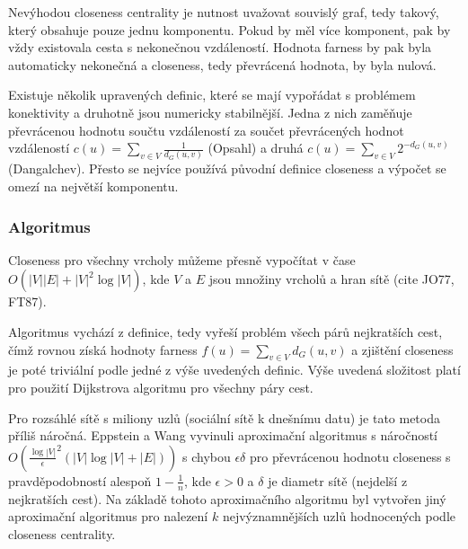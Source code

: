 \documentclass[12pt,titlepage]{report}
\begin{document}
Nevýhodou closeness centrality je nutnost uvažovat souvislý graf, tedy takový,
který obsahuje pouze jednu komponentu. Pokud by měl více komponent, pak by vždy
existovala cesta s nekonečnou vzdáleností. Hodnota farness by pak byla
automaticky nekonečná a closeness, tedy převrácená hodnota, by byla nulová. 

Existuje několik upravených definic, které se mají vypořádat s problémem
konektivity a druhotně jsou numericky stabilnější. Jedna z nich zaměňuje
převrácenou hodnotu součtu vzdáleností za součet převrácených hodnot
vzdáleností $c(u) = \sum_{v \in V} \frac{1}{d_G(u, v)}$ (Opsahl) a druhá $c(u)
= \sum_{v \in V} 2^{-d_G(u, v)}$ (Dangalchev). Přesto se nejvíce používá
původní definice closeness a výpočet se omezí na největší komponentu.


\subsubsection{Algoritmus}
Closeness pro všechny vrcholy můžeme přesně vypočítat v čase $O(|V||E| +
|V|^2\log|V|)$, kde $V$ a $E$ jsou množiny vrcholů a hran sítě (cite JO77,
FT87). 

Algoritmus vychází z definice, tedy vyřeší problém všech párů nejkratších cest,
čímž rovnou získá hodnoty farness $f(u) = \sum_{v \in V} d_G(u, v)$ a zjištění
closeness je poté triviální podle jedné z výše uvedených definic.  Výše uvedená
složitost platí pro použití Dijkstrova algoritmu pro všechny páry cest.

Pro rozsáhlé sítě s miliony uzlů (sociální sítě k dnešnímu datu) je tato
metoda příliš náročná. Eppstein a Wang vyvinuli aproximační algoritmus s
náročností $O(\frac{\log|V|}{\epsilon}^2 (|V| \log |V| + |E|))$ s chybou
$\epsilon \delta$ pro převrácenou hodnotu closeness s pravděpodobností alespoň
$1 - \frac{1}{n}$, kde $\epsilon > 0$ a $\delta$ je diametr sítě (nejdelší z
nejkratších cest). Na základě tohoto aproximačního algoritmu byl vytvořen jiný
aproximační algoritmus pro nalezení $k$ nejvýznamnějších uzlů hodnocených podle
closeness centrality.
\end{document}
